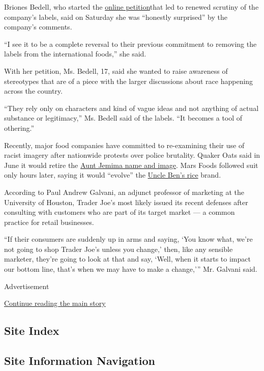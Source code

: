 Briones Bedell, who started the
\href{https://www.change.org/p/trader-joe-s-remove-racist-packaging-from-your-products}{online
petition}that led to renewed scrutiny of the company's labels, said on
Saturday she was ``honestly surprised'' by the company's comments.

``I see it to be a complete reversal to their previous commitment to
removing the labels from the international foods,'' she said.

With her petition, Ms. Bedell, 17, said she wanted to raise awareness of
stereotypes that are of a piece with the larger discussions about race
happening across the country.

``They rely only on characters and kind of vague ideas and not anything
of actual substance or legitimacy,'' Ms. Bedell said of the labels. ``It
becomes a tool of othering.''

Recently, major food companies have committed to re-examining their use
of racist imagery after nationwide protests over police brutality.
Quaker Oats said in June it would retire the
\href{https://www.nytimes.com/2020/06/17/business/media/aunt-jemima-racial-stereotype.html}{Aunt
Jemima name and image}. Mars Foods followed suit only hours later,
saying it would ``evolve'' the
\href{https://www.nytimes.com/2020/06/17/business/aunt-jemima-mrs-butterworth-uncle-ben.html}{Uncle
Ben's rice} brand.

According to Paul Andrew Galvani, an adjunct professor of marketing at
the University of Houston, Trader Joe's most likely issued its recent
defenses after consulting with customers who are part of its target
market --- a common practice for retail businesses.

``If their consumers are suddenly up in arms and saying, `You know what,
we're not going to shop Trader Joe's unless you change,' then, like any
sensible marketer, they're going to look at that and say, `Well, when it
starts to impact our bottom line, that's when we may have to make a
change,''' Mr. Galvani said.

Advertisement

\protect\hyperlink{after-bottom}{Continue reading the main story}

\hypertarget{site-index}{%
\subsection{Site Index}\label{site-index}}

\hypertarget{site-information-navigation}{%
\subsection{Site Information
Navigation}\label{site-information-navigation}}

